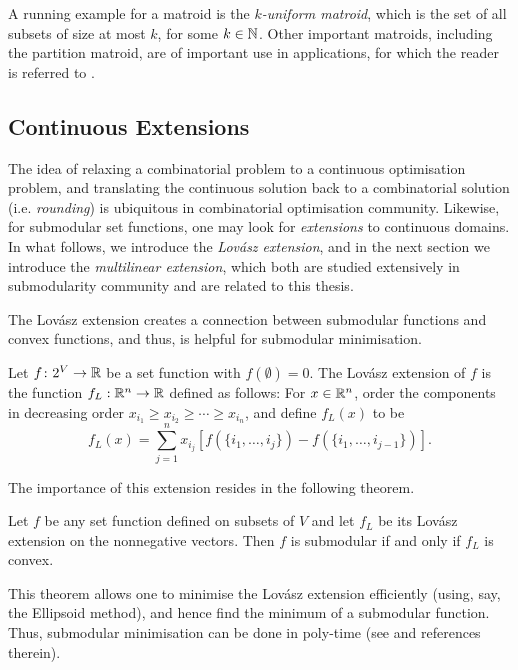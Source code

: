 A running example for a matroid is the \emph{$k$-uniform matroid}, which is the set of all subsets of size at most $k$, for some $k\in\mathbb{N}$. Other important matroids, including the partition matroid, are of important use in applications, for which the reader is referred to \citet[Chapter II.2]{fujishige2005submodular}.


\subsection{Continuous Extensions}\label{sec:extensions}

The idea of relaxing a combinatorial problem to a continuous optimisation problem, and translating the continuous solution back to a combinatorial solution (i.e. \emph{rounding}) is ubiquitous in combinatorial optimisation community. Likewise, for submodular set functions, one may look for \emph{extensions} to continuous domains. In what follows, we introduce the \emph{Lov\'asz extension}, and in the next section we introduce the \emph{multilinear extension}, which both are studied extensively in submodularity community and are related to this thesis.

The Lov\'asz extension \citep{lovasz1983submodular} creates a connection between submodular functions and convex functions, and thus, is helpful for submodular minimisation. 

\begin{definition}
    Let $f\colon 2^V\to\mathbb{R}$ be a set function with $f(\emptyset) = 0$. The Lov\'asz extension of $f$ is the function $f_L:\mathbb{R}^n\to \mathbb{R}$ defined as follows: For $x\in\mathbb{R}^n$, order the components in decreasing order $x_{i_1} \geq x_{i_2} \geq \cdots \geq x_{i_n}$, and define $f_L(x)$ to be 
    \[
        f_L(x) = \sum_{j=1}^n x_{i_j}[f(\{i_1, \ldots, i_j\}) - f(\{i_1, \ldots, i_{j-1}\}) ].
    \]
\end{definition}
The importance of this extension resides in the following theorem.
\begin{theorem}
    Let $f$ be any set function defined on subsets of $V$ and let $f_L$ be its Lov\'asz extension on the nonnegative vectors. Then $f$ is submodular if and only if $f_L$ is convex.
\end{theorem}

This theorem allows one to minimise the Lov\'asz extension efficiently (using, say, the Ellipsoid method), and hence find the minimum of a submodular function. Thus, submodular minimisation can be done in poly-time (see \citet{fujishige2005submodular} and references therein).

